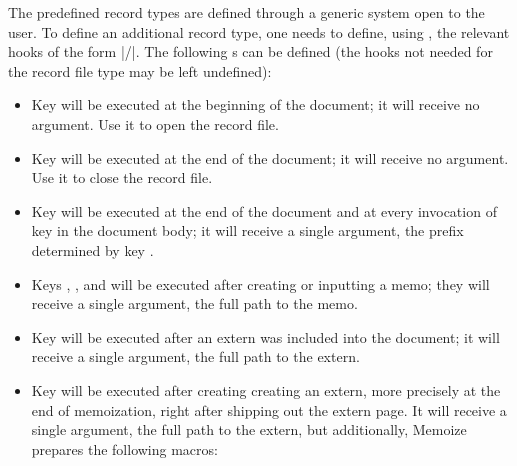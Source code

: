 \documentclass[a4paper,11pt]{article}
\begin{document}
The predefined record types are defined through a generic system open to the
user.  To define an additional record type, one needs to define, using
, the relevant hooks of the form |/|.  The following s can be defined (the hooks
not needed for the record file type may be left undefined):
\begin{itemize}
\item Key  will be executed at the beginning
  of the document; it will receive no argument.  Use it to open the record
  file.
\item Key  will be executed at the end of the
  document; it will receive no argument.  Use it to close the record file.
\item Key  will be executed at the end of the
  document and at every invocation of key  in the document body;
  it will receive a single argument, the prefix determined by key
  .
\item Keys , ,  and
   will be executed after creating or
  inputting a memo; they will receive a single argument, the full path to the
  memo.
\item Key  will be executed after an
  extern was included into the document; it will receive a single argument, the
  full path to the extern.
\item Key  will be executed after
  creating creating an extern, more precisely at the end of memoization, right
  after shipping out the extern page.  It will receive a single argument, the
  full path to the extern, but additionally, Memoize prepares the following
  macros:
\end{itemize}
\end{document}
